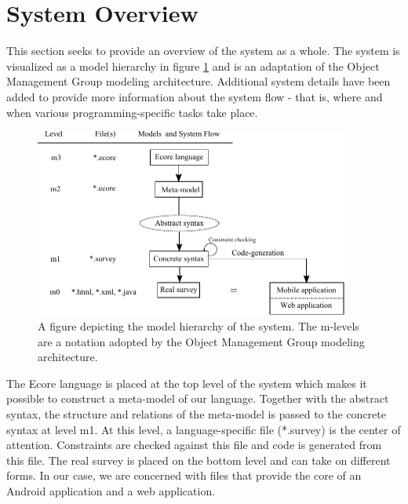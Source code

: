 \documentclass[runningheads]{llncs}
\begin{document}
\section{System Overview}
This section seeks to provide an overview of the system as a whole. The system is visualized as a model hierarchy in figure \ref{fig:mhier} and is an adaptation of the Object Management Group\cite{omg} modeling architecture. Additional system details have been added to provide more information about the system flow - that is, where and when various programming-specific tasks take place.
\begin{figure}
\centering
\includegraphics[height=6.2cm]{modelhierarchy}
\caption{A figure depicting the model hierarchy of the system. The m-levels are a notation adopted by the Object Management Group\cite{omg} modeling architecture.}
\label{fig:mhier}
\end{figure}
The Ecore language is placed at the top level of the system which makes it possible to construct a meta-model of our language. Together with the abstract syntax, the structure and relations of the meta-model is passed to the concrete syntax at level m1. At this level, a language-specific file (*.survey) is the center of attention. Constraints are checked against this file and code is generated from this file. The real survey is placed on the bottom level and can take on different forms. In our case, we are concerned with files that provide the core of an Android application and a web application.
\end{document}
